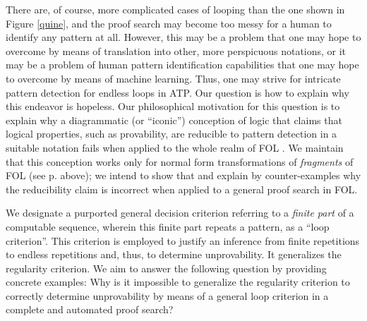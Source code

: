 \documentclass[%
  manuscript=article,   %
  year=2024,
  volume=77,
  doi=00000.000,
]{zfn}
\begin{document}
There are, of course, more complicated cases of looping than the one shown in Figure \ref{quine}, and the proof search may become too messy for a human to identify any pattern at all. However, this may be a problem that one may hope to overcome by means of translation into other, more perspicuous notations, or it may be a problem of human pattern identification capabilities that one may hope to overcome by means of machine learning. Thus, one may strive for intricate pattern detection for endless loops in ATP.
Our question is how to explain why this endeavor is hopeless.
Our philosophical motivation for this question is to explain why a diagrammatic (or ``iconic'')
conception of logic that claims that logical properties, such as provability, are reducible to pattern detection in a suitable notation fails when applied to the whole realm of FOL \parencite[cf.][for details about this diagrammatic (or iconic) conception of logic, which is based on insights from Wittgenstein's early work]{Lampert3}. We maintain that this conception works only for normal form transformations of \emph{fragments} of FOL (see p. \pageref{normalforms} above); we intend to show that and explain by counter-examples why the reducibility claim is incorrect when applied to a general proof search in FOL.


We designate a purported general decision criterion referring to a \emph{finite part} of a computable sequence, wherein this finite part repeats a pattern, as a ``loop criterion''. This criterion is employed to justify an inference from finite repetitions to endless repetitions and, thus, to determine unprovability. It generalizes the regularity criterion. We aim to answer the following question by providing concrete examples: Why is it impossible to generalize the regularity criterion to correctly determine unprovability by means of a general loop criterion in a complete and automated proof search?
\end{document}
